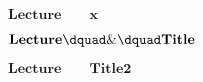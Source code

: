 \setcounter{section}{0}
\setcounter{equation}{0}
\newpage
\vspace*{\fill}
\begingroup
\thispagestyle{empty}
\begin{center}
    \fontsize{50pt}{0} $\mathbf{Lecture \qquad x}$
    \par
    \fontsize{50pt}{0} $\mathbf{Lecture \dquad\&\dquad Title}$
    \par
    \fontsize{50pt}{0} $\mathbf{Lecture \qquad Title 2}$
\end{center}
\endgroup
\vspace*{\fill}
\newpage